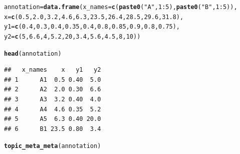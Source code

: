 \documentclass[12pt]{article}\usepackage[]{graphicx}\usepackage[usenames,dvipsnames]{color}
\makeatletter
\newcommand{\hlnum}[1]{\textcolor[rgb]{0.686,0.059,0.569}{#1}}%
\newcommand{\hlstr}[1]{\textcolor[rgb]{0.192,0.494,0.8}{#1}}%
\newcommand{\hlopt}[1]{\textcolor[rgb]{0,0,0}{#1}}%
\newcommand{\hlstd}[1]{\textcolor[rgb]{0.345,0.345,0.345}{#1}}%
\newcommand{\hlkwb}[1]{\textcolor[rgb]{0.69,0.353,0.396}{#1}}%
\newcommand{\hlkwc}[1]{\textcolor[rgb]{0.333,0.667,0.333}{#1}}%
\newcommand{\hlkwd}[1]{\textcolor[rgb]{0.737,0.353,0.396}{\textbf{#1}}}%
\newenvironment{kframe}{%
 \def\at@end@of@kframe{}%
 \ifinner\ifhmode%
  \def\at@end@of@kframe{\end{minipage}}%
  \begin{minipage}{\columnwidth}%
 \fi\fi%
 \def\FrameCommand##1{\hskip\@totalleftmargin \hskip-\fboxsep
 \colorbox{shadecolor}{##1}\hskip-\fboxsep
     \hskip-\linewidth \hskip-\@totalleftmargin \hskip\columnwidth}%
 \MakeFramed {\advance\hsize-\width
   \@totalleftmargin\z@ \linewidth\hsize
   \@setminipage}}%
 {\par\unskip\endMakeFramed%
 \at@end@of@kframe}
\newenvironment{knitrout}{}{} %
\makeatother
\begin{document}
\begin{knitrout}
\color{fgcolor}\begin{kframe}
\begin{alltt}
\hlstd{annotation} \hlkwb{=} \hlkwd{data.frame}\hlstd{(}\hlkwc{x_names} \hlstd{=} \hlkwd{c}\hlstd{(}\hlkwd{paste0}\hlstd{(}\hlstr{"A"}\hlstd{,}\hlnum{1}\hlopt{:}\hlnum{5}\hlstd{),} \hlkwd{paste0}\hlstd{(}\hlstr{"B"}\hlstd{,}\hlnum{1}\hlopt{:}\hlnum{5}\hlstd{)),}
\hlkwc{x} \hlstd{=} \hlkwd{c}\hlstd{(}\hlnum{0.5}\hlstd{,}\hlnum{2.0}\hlstd{,} \hlnum{3.2}\hlstd{,} \hlnum{4.6}\hlstd{,} \hlnum{6.3}\hlstd{,}  \hlnum{23.5}\hlstd{,} \hlnum{26.4}\hlstd{,} \hlnum{28.5}\hlstd{,} \hlnum{29.6}\hlstd{,} \hlnum{31.8}\hlstd{),}
\hlkwc{y1} \hlstd{=} \hlkwd{c}\hlstd{(}\hlnum{0.4}\hlstd{,} \hlnum{0.3}\hlstd{,} \hlnum{0.4}\hlstd{,} \hlnum{0.35}\hlstd{,} \hlnum{0.4}\hlstd{,} \hlnum{0.8}\hlstd{,} \hlnum{0.85}\hlstd{,} \hlnum{0.9}\hlstd{,} \hlnum{0.8}\hlstd{,} \hlnum{0.75}\hlstd{),}
\hlkwc{y2} \hlstd{=}\hlkwd{c}\hlstd{(}\hlnum{5}\hlstd{,} \hlnum{6.6}\hlstd{,} \hlnum{4}\hlstd{,} \hlnum{5.2}\hlstd{,} \hlnum{20}\hlstd{,} \hlnum{3.4}\hlstd{,} \hlnum{5.6}\hlstd{,} \hlnum{4.5}\hlstd{,} \hlnum{8}\hlstd{,} \hlnum{10}\hlstd{))}

\hlkwd{head}\hlstd{(annotation)}
\end{alltt}
\begin{verbatim}
##   x_names    x   y1   y2
## 1      A1  0.5 0.40  5.0
## 2      A2  2.0 0.30  6.6
## 3      A3  3.2 0.40  4.0
## 4      A4  4.6 0.35  5.2
## 5      A5  6.3 0.40 20.0
## 6      B1 23.5 0.80  3.4
\end{verbatim}
\begin{alltt}
\hlkwd{topic_meta_meta}\hlstd{(annotation)}
\end{alltt}
\end{kframe}
\end{knitrout}
\end{document}
